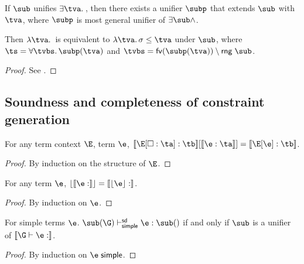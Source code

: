 \documentclass[acmsmall,screen,nonacm,review]{acmart}
\begin{document}
\begin{lemma}
  If $\sub$ unifies $\cexists \tv \c$, then there exists a unifier $\subp$ that extends $\sub$ with $\tv$,
  where $\subp$ is most general unifier of $\exists \sub \cand \c$.


  Then $\cabs \tv \c$ is equivalent to $\cabs \tv \sigma \leq \tv$ under $\sub$, where $\ts = \tfor \tvbs \subp(\tv)$ and
  $\tvbs = \fvs {\subp(\tv)} \setminus \rng \sub$.
  \begin{proof}
    See \citep{Pottier-Remy/emlti}.
  \end{proof}
\end{lemma}

\subsection{Soundness and completeness of constraint generation}

\begin{lemma}
  For any term context $\E$, term $\e$, $\ctxinfer \E \ta \tb \where{\cinfer \e \ta} = \cinfer {\E\where{\e}} \tb$.
  \begin{proof}
    By induction on the structure of $\E$.
  \end{proof}
\end{lemma}

\begin{lemma}
  For any term $\e$, $\cerase {\cinfer \e \t} = \cinfer {\eerase \e} \t$.
  \begin{proof}
    By induction on $\e$.
  \end{proof}
\end{lemma}

\begin{lemma}
  For simple terms $\e$.
  $\sub(\G) \thsimplesd \e : \sub(\t)$ if and only if $\sub$ is a unifier of $\csem {\G \th \e : \t}$.
  \begin{proof}
    By induction on $\e \simple$.
  \end{proof}
\end{lemma}
\end{document}
